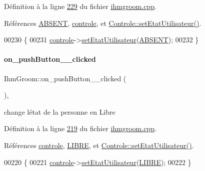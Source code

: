 Définition à la ligne \hyperlink{ihmgroom_8cpp_source_l00229}{229} du fichier \hyperlink{ihmgroom_8cpp_source}{ihmgroom.\+cpp}.



Références \hyperlink{ihmgroom_8h_source_l00030}{A\+B\+S\+E\+NT}, \hyperlink{ihmgroom_8h_source_l00089}{controle}, et \hyperlink{controle_8cpp_source_l00018}{Controle\+::set\+Etat\+Utilisateur()}.


\begin{DoxyCode}
00230 \{
00231     \hyperlink{class_ihm_groom_acead732c303b50a3285bd311ac8a3b4f}{controle}->\hyperlink{class_controle_a62db54114d126d03dd332332b3942320}{setEtatUtilisateur}(\hyperlink{ihmgroom_8h_a62d1ab4a9b5e2f95388be50a975cc97d}{ABSENT});
00232 \}
\end{DoxyCode}
\mbox{\label{class_ihm_groom_a1d981f0754a5fa2b01036fc5125fded2}} 
\paragraph{\texorpdfstring{on\+\_\+push\+Button\+\_\+\_\+clicked}{on\_pushButton\_3\_clicked}}
{\footnotesize\ttfamily Ihm\+Groom\+::on\+\_\+push\+Button\+\_\+\_\+clicked (\begin{DoxyParamCaption}{ }\end{DoxyParamCaption})\hspace{0.3cm}{\ttfamily [private]}, {\ttfamily [slot]}}



change l\textquotesingle{}état de la personne en Libre 



Définition à la ligne \hyperlink{ihmgroom_8cpp_source_l00219}{219} du fichier \hyperlink{ihmgroom_8cpp_source}{ihmgroom.\+cpp}.



Références \hyperlink{ihmgroom_8h_source_l00089}{controle}, \hyperlink{ihmgroom_8h_source_l00024}{L\+I\+B\+RE}, et \hyperlink{controle_8cpp_source_l00018}{Controle\+::set\+Etat\+Utilisateur()}.


\begin{DoxyCode}
00220 \{
00221     \hyperlink{class_ihm_groom_acead732c303b50a3285bd311ac8a3b4f}{controle}->\hyperlink{class_controle_a62db54114d126d03dd332332b3942320}{setEtatUtilisateur}(\hyperlink{ihmgroom_8h_a508cc209fbc99ea975d1c1ecb5f1c6fe}{LIBRE});
00222 \}
\end{DoxyCode}
\mbox{\label{class_ihm_groom_addb07bf87d4d6f7eb5604d742a6bf2ef}} 
